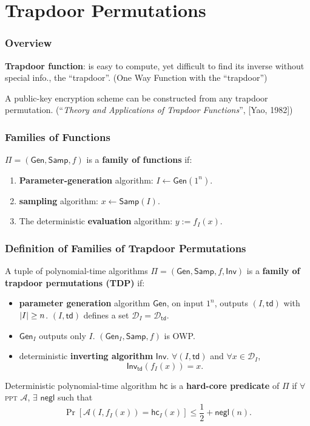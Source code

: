 \section{Trapdoor Permutations}
\begin{frame}\frametitle{Overview}
\textbf{Trapdoor function}: is easy to compute, yet difficult to find its inverse without special info., the ``trapdoor''. (One Way Function with the ``trapdoor'')
\newline

A public-key encryption scheme can be constructed from any trapdoor permutation. (``\emph{Theory and Applications of Trapdoor Functions}'', [Yao, 1982])
\begin{figure}
\begin{center}

\end{center}
\end{figure}
\end{frame}
\begin{frame}\frametitle{Families of Functions}
\begin{figure}
\begin{center}

\end{center}
\end{figure}
\begin{definition}
$\Pi = (\mathsf{Gen}, \mathsf{Samp}, f)$ is a \textbf{family of functions} if:
\begin{enumerate}
\item \textbf{Parameter-generation} algorithm: $I \gets \mathsf{Gen}(1^n)$.
\item \textbf{sampling} algorithm: $x \gets \mathsf{Samp}(I)$.
\item The deterministic \textbf{evaluation} algorithm: $y := f_I(x)$.
\end{enumerate}
\end{definition}
\end{frame}
\begin{frame}\frametitle{Definition of Families of Trapdoor Permutations}
A tuple of polynomial-time algorithms $\Pi = (\mathsf{Gen}, \mathsf{Samp}, f, \mathsf{Inv})$ is a \textbf{family of trapdoor permutations (TDP)} if:
\begin{itemize}
\item \textbf{parameter generation} algorithm $\mathsf{Gen}$, on input $1^n$, outputs $(I,\mathsf{td})$ with $\lvert I\rvert \ge n$. $(I, \mathsf{td})$ defines a set $\mathcal{D}_I = \mathcal{D}_{\mathsf{td}}$.
\item $\mathsf{Gen}_I$ outputs only $I$.
$(\mathsf{Gen}_I, \mathsf{Samp}, f)$ is OWP.
\item deterministic \textbf{inverting algorithm} $\mathsf{Inv}$. $\forall (I,\mathsf{td})$ and $\forall x \in \mathcal{D}_{I}$, 
\[ \mathsf{Inv}_{\mathsf{td}}(f_I(x))=x.\]
\end{itemize}
Deterministic polynomial-time algorithm $\mathsf{hc}$ is a \textbf{hard-core predicate} of $\Pi$ if $\forall$ \textsc{ppt} $\mathcal{A}$, $\exists$ $\mathsf{negl}$ such that
\[ \Pr[\mathcal{A}(I,f_I(x)) = \mathsf{hc}_I(x)] \le \frac{1}{2} +\mathsf{negl}(n). \]
\end{frame}
